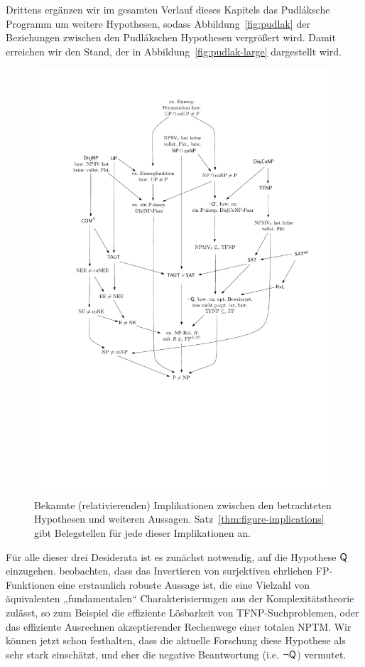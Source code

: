 Drittens ergänzen wir im gesamten Verlauf dieses Kapitels das Pudláksche Programm um weitere Hypothesen, sodass Abbildung~\ref{fig:pudlak} der Beziehungen zwischen den Pudlákschen Hypothesen vergrößert wird. Damit erreichen wir den Stand, der in Abbildung~\ref{fig:pudlak-large} dargestellt wird.


\begin{figure}\label{fig:pudlak-large}
    \hspace*{-12mm}\includegraphics[page=1]{figures.pdf}
    \caption{Bekannte (relativierenden) Implikationen zwischen den betrachteten Hypothesen und weiteren Aussagen. Satz~\ref{thm:figure-implications} gibt Belegstellen für jede dieser Implikationen an.}\label{fig:figure-implications}
\end{figure}

Für alle dieser drei Desiderata ist es zunächst notwendig, auf die Hypothese $\mathsf{Q}$ einzugehen.
\textcite{fenner_inverting_2003} beobachten, dass das Invertieren von surjektiven ehrlichen FP-Funktionen eine erstaunlich robuste Aussage ist, die eine Vielzahl von äquivalenten „fundamentalen“ \parencite{fenner_inverting_2003} Charakterisierungen aus der Komplexitätstheorie zulässt, so zum Beispiel die effiziente Lösbarkeit von TFNP-Suchproblemen, oder das effiziente Ausrechnen akzeptierender Rechenwege einer totalen NPTM. Wir können jetzt schon festhalten, dass die aktuelle Forschung diese Hypothese als sehr stark einschätzt, und eher die negative Beantwortung (i.e. $\neg\mathsf{Q}$) vermutet.



